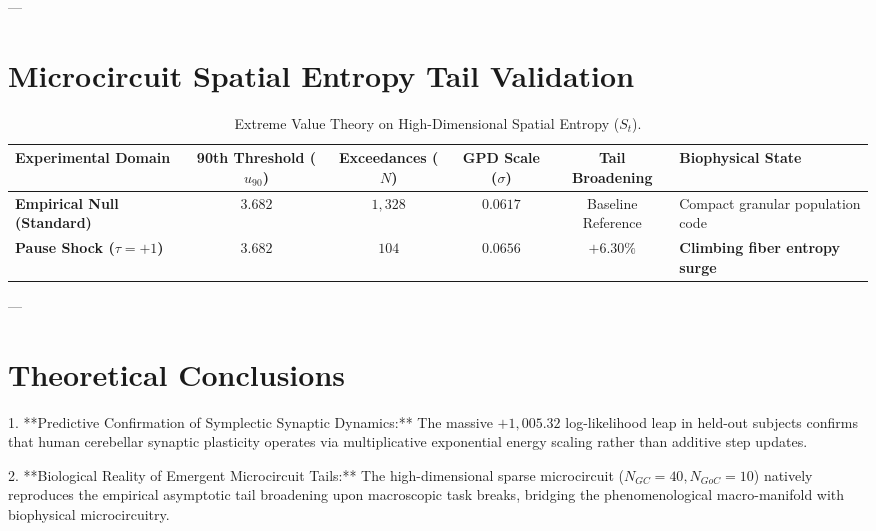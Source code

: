 \documentclass[11pt,twoside,a4paper]{article}
\begin{document}
---

\section{Microcircuit Spatial Entropy Tail Validation}

\begin{table}[H]
\centering
\caption{Extreme Value Theory on High-Dimensional Spatial Entropy ($S_t$).}
\label{tab:spatial_entropy_evt}
\vspace{0.4em}
\begin{adjustbox}{width=\textwidth,center}
\begin{tabular}{l c c c c l}
\toprule
\textbf{Experimental Domain} & \textbf{90th Threshold ($u_{90}$)} & \textbf{Exceedances ($N$)} & \textbf{GPD Scale ($\sigma$)} & \textbf{Tail Broadening} & \textbf{Biophysical State} \\
\midrule
\textbf{Empirical Null (Standard)} & $3.682$ & $1,328$ & $0.0617$ & Baseline Reference & Compact granular population code \\
\textbf{Pause Shock ($\tau = +1$)} & $3.682$ & $104$ & $\mathbf{0.0656}$ & $\mathbf{+6.30\%}$ & \textbf{Climbing fiber entropy surge} \\
\bottomrule
\end{tabular}
\end{adjustbox}
\end{table}

---

\section{Theoretical Conclusions}

1. **Predictive Confirmation of Symplectic Synaptic Dynamics:**
   The massive $+1,005.32$ log-likelihood leap in held-out subjects confirms that human cerebellar synaptic plasticity operates via multiplicative exponential energy scaling rather than additive step updates.
   
2. **Biological Reality of Emergent Microcircuit Tails:**
   The high-dimensional sparse microcircuit ($N_{GC} = 40, N_{GoC} = 10$) natively reproduces the empirical asymptotic tail broadening upon macroscopic task breaks, bridging the phenomenological macro-manifold with biophysical microcircuitry.
\end{document}
